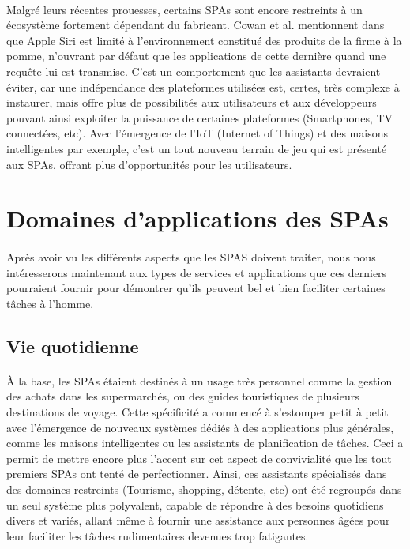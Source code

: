 \paragraph{}
Malgré leurs récentes prouesses, certains SPAs sont encore restreints à un écosystème fortement dépendant du fabricant.  Cowan et al. mentionnent dans \cite{Cowan2017} que Apple Siri est limité à l'environnement constitué des produits de la firme à la pomme, n'ouvrant par défaut que les applications de cette dernière quand une requête lui est transmise. C'est un comportement que les assistants devraient éviter, car une indépendance des plateformes utilisées est, certes, très complexe à instaurer, mais offre plus de possibilités aux utilisateurs et aux développeurs pouvant ainsi exploiter la puissance de certaines plateformes (Smartphones, TV connectées, etc).
Avec l'émergence de l'IoT (Internet of Things) et des maisons intelligentes  par exemple, c'est un tout nouveau terrain de jeu qui est présenté aux SPAs, offrant plus d'opportunités pour les utilisateurs.
\section{Domaines d'applications des SPAs}
\paragraph{}
Après avoir vu les différents aspects que les SPAS doivent traiter, nous nous intéresserons maintenant aux types de services et applications que ces derniers pourraient fournir pour démontrer qu'ils peuvent bel et bien faciliter certaines tâches à l'homme.

\subsection{Vie quotidienne}
\paragraph{}
À la base, les SPAs étaient destinés à un usage très personnel comme la gestion des achats dans les supermarchés, ou des guides touristiques de plusieurs destinations de voyage. Cette spécificité a commencé à s'estomper petit à petit avec l'émergence de nouveaux systèmes dédiés à des applications plus générales, comme les maisons intelligentes ou les assistants de planification de tâches. Ceci a permit de mettre encore plus l'accent sur cet aspect de convivialité que les tout premiers SPAs ont tenté de perfectionner. Ainsi, ces assistants spécialisés dans des domaines restreints (Tourisme, shopping, détente, etc) ont été regroupés dans un seul système plus polyvalent, capable de répondre à des besoins quotidiens divers et variés, allant même à fournir une assistance aux personnes âgées pour leur faciliter les tâches rudimentaires devenues trop fatigantes. 
